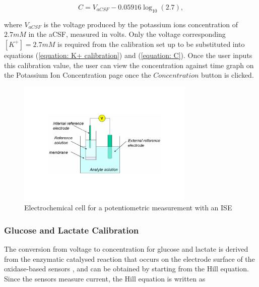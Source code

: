 \begin{equation}
    C = V_{aCSF} - 0.05916\log_{10} (2.7),
    \label{equation: C}
\end{equation}

\noindent where $V_{aCSF}$ is the voltage produced by the potassium ions concentration of $2.7mM$ in the aCSF, measured in volts. Only the voltage corresponding $[K^{+}] = 2.7mM$ is required from the calibration set up to be substituted into equations (\ref{equation: K+ calibration}) and (\ref{equation: C}). Once the user inputs this calibration value, the user can view the concentration against time graph on the Potassium Ion Concentration page once the $Concentration$ button is clicked. \newline

\begin{figure}[h!]
\centering
\includegraphics[trim={0cm 5cm 0cm  5cm}, clip, width=0.75\textwidth]{./figures/ISE.pdf}
\captionsetup{justification=centering}
\caption{Electrochemical cell for a potentiometric measurement with an ISE \cite{LibreTexts2019}}
\label{fig: ISE}
\end{figure}


\subsubsection{Glucose and Lactate Calibration}

The conversion from voltage to concentration for glucose and lactate is derived from the enzymatic catalysed reaction that occurs on the electrode surface of the oxidase-based sensors \cite{Patel:2011:10.1016/j.bios.2010.11.033, Rogers2017}, and can be obtained by starting from the Hill equation. Since the sensors measure current, the Hill equation is written as


